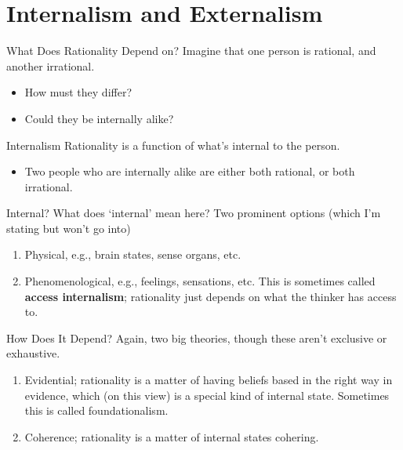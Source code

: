 \documentclass[
  17pt,
  letterpaper,
  ignorenonframetext,
  aspectratio=169,
  handout]{beamer}
\providecommand{\tightlist}{%
  \setlength{\itemsep}{0pt}\setlength{\parskip}{0pt}}\usepackage{longtable,booktabs,array}
\begin{document}
\hypertarget{internalism-and-externalism}{%
\section{Internalism and
Externalism}\label{internalism-and-externalism}}

\begin{frame}{What Does Rationality Depend on?}
\protect\hypertarget{what-does-rationality-depend-on}{}
Imagine that one person is rational, and another irrational.

\begin{itemize}[<+->]
\tightlist
\item
  How must they differ?
\item
  Could they be internally alike?
\end{itemize}
\end{frame}

\begin{frame}{Internalism}
\protect\hypertarget{internalism}{}
Rationality is a function of what's internal to the person.

\begin{itemize}[<+->]
\tightlist
\item
  Two people who are internally alike are either both rational, or both
  irrational.
\end{itemize}
\end{frame}

\begin{frame}{Internal?}
\protect\hypertarget{internal}{}
What does `internal' mean here? Two prominent options (which I'm stating
but won't go into)

\begin{enumerate}[<+->]
\tightlist
\item
  Physical, e.g., brain states, sense organs, etc.
\item
  Phenomenological, e.g., feelings, sensations, etc. This is sometimes
  called \textbf{access internalism}; rationality just depends on what
  the thinker has access to.
\end{enumerate}
\end{frame}

\begin{frame}{How Does It Depend?}
\protect\hypertarget{how-does-it-depend}{}
Again, two big theories, though these aren't exclusive or exhaustive.

\begin{enumerate}[<+->]
\tightlist
\item
  Evidential; rationality is a matter of having beliefs based in the
  right way in evidence, which (on this view) is a special kind of
  internal state. Sometimes this is called foundationalism.
\item
  Coherence; rationality is a matter of internal states cohering.
\end{enumerate}
\end{frame}
\end{document}
